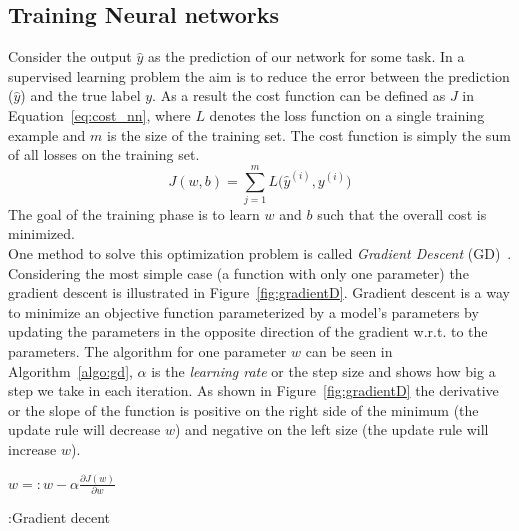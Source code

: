 \subsection{Training  Neural networks}
Consider the output $\hat { y } $ as the prediction of our network for some task. In a supervised learning problem the aim is to reduce the error between the prediction ($\hat { y } $) and the true label $y$. As a result the cost function can be defined as $J$ in Equation~\ref{eq:cost_nn}, where $L$ denotes the loss function on a single training example and $m$ is the size of the training set. The cost function is simply the sum of all losses on the training set.
\begin{equation}
J(w,b)=\sum _{ j=1 }^{ m }{ L( } \hat { y }^{ (i) } ,y^{ (i) })
\label{eq:cost_nn}
\end{equation}
The goal of the training phase is to learn $w$ and $b$ such that the overall cost is minimized. \\
\noindent 
One method to solve this optimization problem is called \emph{Gradient Descent} (GD)~. Considering the most simple case (a function with only one parameter) the gradient descent is illustrated in Figure~\ref{fig:gradientD}. Gradient descent is a way to minimize an objective function parameterized by a model’s parameters by updating the parameters in the opposite direction of the gradient w.r.t. to the parameters. The algorithm for one parameter $w$ can be
seen in Algorithm~\ref{algo:gd}, $\alpha$ is the \emph{learning rate} or the step size and shows how big a step we take in each iteration. As shown in Figure~\ref{fig:gradientD} the derivative or the slope of the function is positive on the right side of the minimum (the update rule will decrease $w$) and negative on the left size (the update rule will increase $w$). \\


\begin{algorithm}[htbp]
  \begin{algorithmic}[1]
    \newcommand{\UF}{\mathrm{U}}
 \State $w=: w- \alpha\frac { \partial J(w) }{ \partial w } $
  \EndWhile
  \end{algorithmic}
\caption{:Gradient decent }
 \label{algo:gd}
\end{algorithm}


